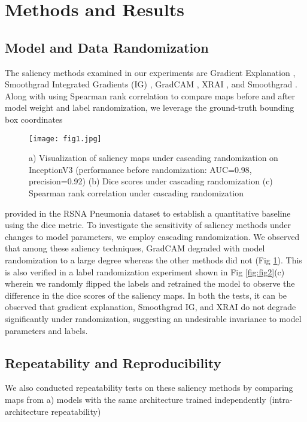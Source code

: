 \documentclass{midl} %
\begin{document}
\section{Methods and Results}
\subsection{Model and Data Randomization}
The saliency methods examined in our experiments are
Gradient Explanation \cite{simonyan2013deep},
Smoothgrad Integrated Gradients (IG) \cite{sundararajan2017axiomatic},
GradCAM \cite{selvaraju2016grad},
XRAI \cite{kapishnikov2019xrai}, and
Smoothgrad \cite{smilkov2017smoothgrad}. Along with using Spearman rank correlation to compare maps before and after model weight and label randomization, we leverage the ground-truth bounding box coordinates 
\par
\begin{figure}[H]
\centering\texttt{[image: fig1.jpg]}
\caption{a) Visualization of saliency maps under cascading randomization on InceptionV3 (performance before randomization: AUC=0.98, precision=0.92) (b) Dice scores under cascading randomization (c) Spearman rank correlation under cascading randomization}
\label{fig:fig1}
\end{figure}

\noindent provided in the RSNA Pneumonia dataset to establish a quantitative baseline using the dice metric. To investigate the sensitivity of saliency methods under changes to model parameters, we employ cascading randomization. \cite{adebayo2018sanity} We observed that among these saliency techniques, GradCAM degraded with model randomization to a large degree whereas the other methods did not (Fig \ref{fig:fig1}). This is also verified in a label randomization experiment shown in Fig \ref{fig:fig2}(c) wherein we randomly flipped the labels and retrained the model to observe the difference in the dice scores of the saliency maps. In both the tests, it can be observed that gradient explanation, Smoothgrad IG, and XRAI do not degrade significantly under randomization, suggesting an undesirable invariance to model parameters and labels.

\subsection{Repeatability and Reproducibility}
We also conducted repeatability tests on these saliency methods by comparing maps from a) models with the same architecture trained independently (intra-architecture repeatability) \par
\end{document}

